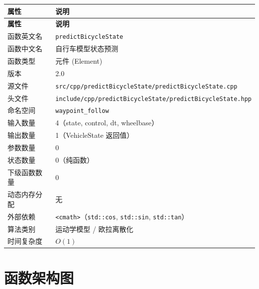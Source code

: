 \documentclass[a4paper,10pt]{article}
\begin{document}
\renewcommand{\arraystretch}{1.3}
\begin{longtable}{|L{3.8cm}|L{11.5cm}|}
\hline
\textbf{属性} & \textbf{说明} \\
\hline
\endfirsthead
\hline
\textbf{属性} & \textbf{说明} \\
\hline
\endhead
函数英文名 & \texttt{predictBicycleState} \\
\hline
函数中文名 & 自行车模型状态预测 \\
\hline
函数类型 & 元件 (Element) \\
\hline
版本 & 2.0 \\
\hline
源文件 & \texttt{src/cpp/predictBicycleState/predictBicycleState.cpp} \\
\hline
头文件 & \texttt{include/cpp/predictBicycleState/predictBicycleState.hpp} \\
\hline
命名空间 & \texttt{waypoint\_follow} \\
\hline
输入数量 & 4（state, control, dt, wheelbase） \\
\hline
输出数量 & 1（VehicleState 返回值） \\
\hline
参数数量 & 0 \\
\hline
状态数量 & 0（纯函数） \\
\hline
下级函数数量 & 0 \\
\hline
动态内存分配 & 无 \\
\hline
外部依赖 & \texttt{<cmath>}（\texttt{std::cos}, \texttt{std::sin}, \texttt{std::tan}） \\
\hline
算法类别 & 运动学模型 / 欧拉离散化 \\
\hline
时间复杂度 & $O(1)$ \\
\hline
\end{longtable}

\section{函数架构图}

\begin{center}
\end{center}
\end{document}

